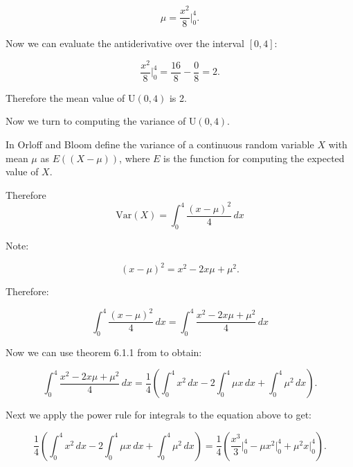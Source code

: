 \documentclass[a4paper,11pt]{article}
\begin{document}
\begin{equation}
  \mu =  \frac{x^2}{8} \bigg\rvert_0^4.
\end{equation}

Now we can evaluate the antiderivative over the interval $\left[ 0, 4 \right]$:


\begin{equation}
  \frac{x^2}{8} \bigg\rvert_0^4
  = \frac{16}{8} - \frac{0}{8} = 2.
\end{equation}

Therefore the mean value of U$\left(0,4 \right)$ is 2.

Now we turn to computing the variance of U$\left(0,4 \right)$.

In \cite{reading6a} Orloff and Bloom define the variance of a continuous
random variable $X$ with mean $\mu$ as
$E \left( \left(X - \mu \right) \right)$, where $E$ is the function for
computing the expected value of $X$.

Therefore
\begin{equation}
  \text{Var}\left( X \right) =
  \int_0^4 \frac{\left( x - \mu \right)^2}{4} \, dx
\end{equation}

Note:

\begin{equation}
\left( x - \mu \right)^2 = x^2 - 2x\mu + \mu^2.
\end{equation}

Therefore:

\begin{equation}
  \int_0^4 \frac{\left( x - \mu \right)^2}{4} \, dx
  =
  \int_0^4 \frac{x^2 - 2x\mu + \mu^2}{4} \, dx
\end{equation}

Now we can use theorem 6.1.1 from \cite{basicInt} to obtain:

\begin{equation}
  \int_0^4 \frac{x^2 - 2x\mu + \mu^2}{4} \, dx
  = \frac{1}{4} \left( \int_0^4 x^2\,dx - 2\int_0^4 \mu x \,dx
  +\int_0^4 \mu^2 \,dx \right).
\end{equation}

Next we apply the power rule for integrals \cite{basicInt} to the equation
above to get:

\begin{equation}
   \frac{1}{4} \left( \int_0^4 x^2\,dx - 2\int_0^4 \mu x \,dx
  +\int_0^4 \mu^2 \,dx \right) =
  \frac{1}{4} \left( \frac{x^3}{3} \bigg\rvert_0^4 - \mu x^2 \bigg\rvert_0^4
    + \mu^2 x \bigg\rvert_0^4 \right).
\end{equation}
\end{document}
